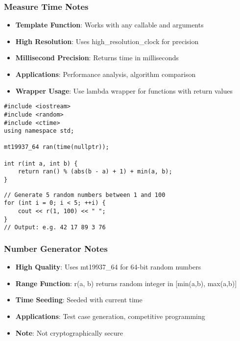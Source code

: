 \documentclass[11pt,a4paper]{article}
\begin{document}
\subsubsection{Measure Time Notes}
\begin{itemize}
\item \textbf{Template Function}: Works with any callable and arguments
\item \textbf{High Resolution}: Uses high\_resolution\_clock for precision
\item \textbf{Millisecond Precision}: Returns time in milliseconds
\item \textbf{Applications}: Performance analysis, algorithm comparison
\item \textbf{Wrapper Usage}: Use lambda wrapper for functions with return values
\end{itemize}

\newpage
\begin{lstlisting}[caption={Random Number Generator}]
#include <iostream>
#include <random>
#include <ctime>
using namespace std;

mt19937_64 ran(time(nullptr));

int r(int a, int b) {
    return ran() % (abs(b - a) + 1) + min(a, b);
}
\end{lstlisting}

\begin{lstlisting}[caption={Random Number Generator Example Usage}]
// Generate 5 random numbers between 1 and 100
for (int i = 0; i < 5; ++i) {
    cout << r(1, 100) << " ";
}
// Output: e.g. 42 17 89 3 76
\end{lstlisting}



\subsubsection{Number Generator Notes}
\begin{itemize}
\item \textbf{High Quality}: Uses mt19937\_64 for 64-bit random numbers
\item \textbf{Range Function}: r(a, b) returns random integer in [min(a,b), max(a,b)]
\item \textbf{Time Seeding}: Seeded with current time
\item \textbf{Applications}: Test case generation, competitive programming
\item \textbf{Note}: Not cryptographically secure
\end{itemize}
\end{document}
